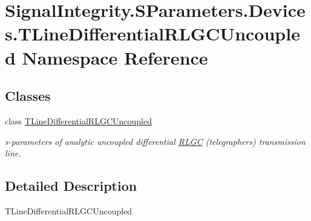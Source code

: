 \hypertarget{namespaceSignalIntegrity_1_1SParameters_1_1Devices_1_1TLineDifferentialRLGCUncoupled}{}\section{Signal\+Integrity.\+S\+Parameters.\+Devices.\+T\+Line\+Differential\+R\+L\+G\+C\+Uncoupled Namespace Reference}
\label{namespaceSignalIntegrity_1_1SParameters_1_1Devices_1_1TLineDifferentialRLGCUncoupled}
\subsection*{Classes}
\begin{DoxyCompactItemize}
\item 
class \hyperlink{classSignalIntegrity_1_1SParameters_1_1Devices_1_1TLineDifferentialRLGCUncoupled_1_1TLineDifferentialRLGCUncoupled}{T\+Line\+Differential\+R\+L\+G\+C\+Uncoupled}
\begin{DoxyCompactList}\small\item\em s-\/parameters of analytic uncoupled differential \hyperlink{namespaceSignalIntegrity_1_1SParameters_1_1RLGC}{R\+L\+GC} (telegrapher\textquotesingle{}s) transmission line. \end{DoxyCompactList}\end{DoxyCompactItemize}


\subsection{Detailed Description}
\begin{DoxyVerb}TLineDifferentialRLGCUncoupled\end{DoxyVerb}
 